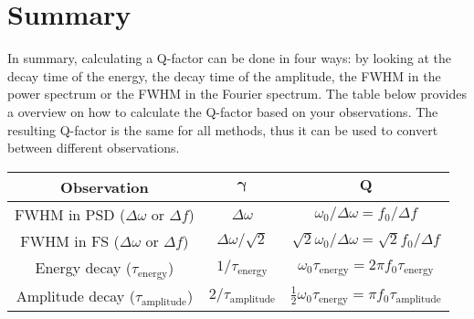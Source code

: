 \section{Summary}
In summary, calculating a Q-factor can be done in four ways: by looking at the decay time of the energy, the decay time of the amplitude, the FWHM in the power spectrum or the FWHM in the Fourier spectrum. The table below provides a overview on how to calculate the Q-factor based on your observations. The resulting Q-factor is the same for all methods, thus it can be used to convert between different observations.

\begin{table}[h]
    \centering
    \begin{tabular}{ccc}
        \toprule
        \textbf{Observation} & $\bm{\gamma}$ & $\bm{Q}$ \\
        \midrule
        FWHM in PSD ($\Delta \omega$ or $\Delta f$) & $\Delta \omega$ & $\omega_0 / \Delta \omega = f_0 / \Delta f$ \\
        FWHM in FS ($\Delta \omega$ or $\Delta f$) & $\Delta \omega / \sqrt{2}$ & $\sqrt{2} \omega_0 / \Delta \omega = \sqrt{2} f_0 / \Delta f$ \\
        Energy decay ($\tau_\text{energy}$) & $1 / \tau_\text{energy}$ & $\omega_0 \tau_\text{energy} = 2\pi f_0 \tau_\text{energy}$ \\
        Amplitude decay ($\tau_\text{amplitude}$) & $2 / \tau_\text{amplitude}$ & $\frac{1}{2} \omega_0 \tau_\text{energy} = \pi f_0 \tau_\text{amplitude}$ \\
        \bottomrule
    \end{tabular}
\end{table}
